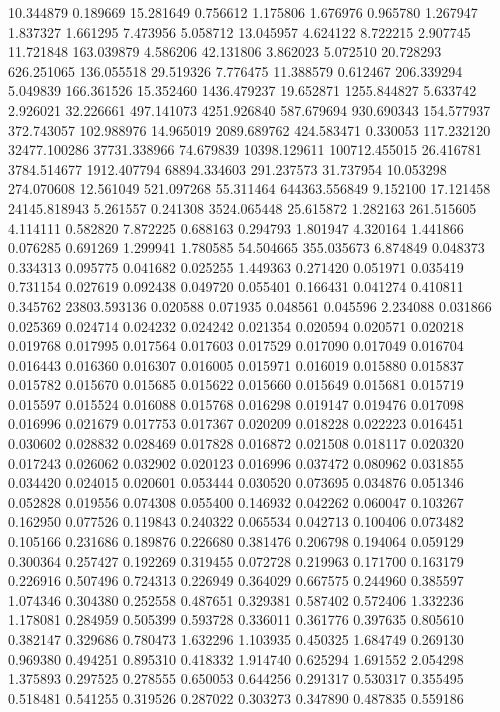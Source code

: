 10.344879
0.189669
15.281649
0.756612
1.175806
1.676976
0.965780
1.267947
1.837327
1.661295
7.473956
5.058712
13.045957
4.624122
8.722215
2.907745
11.721848
163.039879
4.586206
42.131806
3.862023
5.072510
20.728293
626.251065
136.055518
29.519326
7.776475
11.388579
0.612467
206.339294
5.049839
166.361526
15.352460
1436.479237
19.652871
1255.844827
5.633742
2.926021
32.226661
497.141073
4251.926840
587.679694
930.690343
154.577937
372.743057
102.988976
14.965019
2089.689762
424.583471
0.330053
117.232120
32477.100286
37731.338966
74.679839
10398.129611
100712.455015
26.416781
3784.514677
1912.407794
68894.334603
291.237573
31.737954
10.053298
274.070608
12.561049
521.097268
55.311464
644363.556849
9.152100
17.121458
24145.818943
5.261557
0.241308
3524.065448
25.615872
1.282163
261.515605
4.114111
0.582820
7.872225
0.688163
0.294793
1.801947
4.320164
1.441866
0.076285
0.691269
1.299941
1.780585
54.504665
355.035673
6.874849
0.048373
0.334313
0.095775
0.041682
0.025255
1.449363
0.271420
0.051971
0.035419
0.731154
0.027619
0.092438
0.049720
0.055401
0.166431
0.041274
0.410811
0.345762
23803.593136
0.020588
0.071935
0.048561
0.045596
2.234088
0.031866
0.025369
0.024714
0.024232
0.024242
0.021354
0.020594
0.020571
0.020218
0.019768
0.017995
0.017564
0.017603
0.017529
0.017090
0.017049
0.016704
0.016443
0.016360
0.016307
0.016005
0.015971
0.016019
0.015880
0.015837
0.015782
0.015670
0.015685
0.015622
0.015660
0.015649
0.015681
0.015719
0.015597
0.015524
0.016088
0.015768
0.016298
0.019147
0.019476
0.017098
0.016996
0.021679
0.017753
0.017367
0.020209
0.018228
0.022223
0.016451
0.030602
0.028832
0.028469
0.017828
0.016872
0.021508
0.018117
0.020320
0.017243
0.026062
0.032902
0.020123
0.016996
0.037472
0.080962
0.031855
0.034420
0.024015
0.020601
0.053444
0.030520
0.073695
0.034876
0.051346
0.052828
0.019556
0.074308
0.055400
0.146932
0.042262
0.060047
0.103267
0.162950
0.077526
0.119843
0.240322
0.065534
0.042713
0.100406
0.073482
0.105166
0.231686
0.189876
0.226680
0.381476
0.206798
0.194064
0.059129
0.300364
0.257427
0.192269
0.319455
0.072728
0.219963
0.171700
0.163179
0.226916
0.507496
0.724313
0.226949
0.364029
0.667575
0.244960
0.385597
1.074346
0.304380
0.252558
0.487651
0.329381
0.587402
0.572406
1.332236
1.178081
0.284959
0.505399
0.593728
0.336011
0.361776
0.397635
0.805610
0.382147
0.329686
0.780473
1.632296
1.103935
0.450325
1.684749
0.269130
0.969380
0.494251
0.895310
0.418332
1.914740
0.625294
1.691552
2.054298
1.375893
0.297525
0.278555
0.650053
0.644256
0.291317
0.530317
0.355495
0.518481
0.541255
0.319526
0.287022
0.303273
0.347890
0.487835
0.559186
